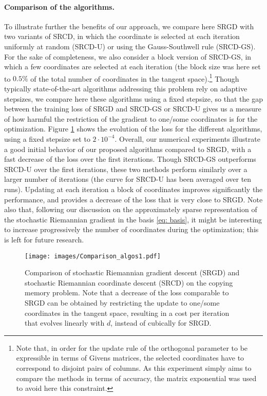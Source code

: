 \documentclass{article}
\begin{document}
\paragraph{Comparison of the algorithms.}
To illustrate further the benefits of our approach, we compare here SRGD with two variants of SRCD, in which the coordinate is selected at each iteration uniformly at random (SRCD-U) or using the Gauss-Southwell rule (SRCD-GS). For the sake of completeness, we also consider a block version of SRCD-GS, in which a few coordinates are selected at each iteration (the block size was here set to $0.5\%$ of the total number of coordinates in the tangent space).\footnote{Note that, in order for the update rule of the orthogonal parameter to be expressible in terms of Givens matrices, the selected coordinates have to correspond to disjoint pairs of columns. As this experiment simply aims to compare the methods in terms of accuracy, the matrix exponential was used to avoid here this constraint.} Though typically state-of-the-art algorithms addressing this problem rely on adaptive stepsizes, we compare here these algorithms using a fixed stepsize, so that the gap between the training loss of SRGD and SRCD-GS or SRCD-U gives us a measure of how harmful the restriction of the gradient to one/some coordinates is for the optimization. Figure \ref{fig:comparison} shows the evolution of the loss for the different algorithms, using a fixed stepsize set to $2 \cdot 10^{-4}$. Overall, our numerical experiments illustrate a good initial behavior of our proposed algorithms compared to SRGD, with a fast decrease of the loss over the first iterations. Though SRCD-GS outperforms SRCD-U over the first iterations, these two methods perform similarly over a larger number of iterations (the curve for SRCD-U has been averaged over ten runs). Updating at each iteration a block of coordinates improves significantly the performance, and provides a decrease of the loss that is very close to SRGD. Note also that, following our discussion on the approximately sparse representation of the stochastic Riemannian gradient in the basis \eqref{eq: basis}, it might be interesting to increase progressively the number of coordinates during the optimization; this is left for future research. 

\begin{figure}[t!]
    \centering
    \texttt{[image: images/Comparison\_algos1.pdf]}
    \caption{Comparison of stochastic Riemannian gradient descent (SRGD) and stochastic Riemannian coordinate descent (SRCD) on the copying memory problem. Note that a decrease of the loss comparable to SRGD can be obtained by restricting the update to one/some coordinates in the tangent space, resulting in a cost per iteration that evolves linearly with $d$, instead of cubically for SRGD.}
    \label{fig:comparison}
\end{figure}
\end{document}
